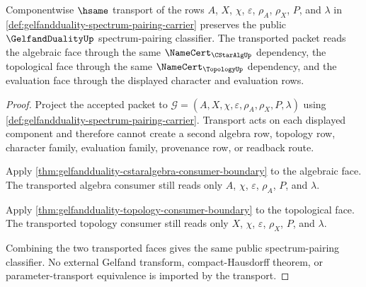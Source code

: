 \begin{theorem}
\label{thm:gelfandduality-spectrum-pairing-classifier-stability}
Componentwise $\hsame$ transport of the rows $A$, $X$, $\chi$, $\varepsilon$,
$\rho_{A}$, $\rho_{X}$, $P$, and $\lambda$ in
\autoref{def:gelfandduality-spectrum-pairing-carrier} preserves the public
$\GelfandDualityUp$ spectrum-pairing classifier. The transported packet reads
the algebraic face through the same $\NameCert_{\CStarAlgUp}$ dependency, the
topological face through the same $\NameCert_{\TopologyUp}$ dependency, and the
evaluation face through the displayed character and evaluation rows.
\end{theorem}
\begin{proof}
Project the accepted packet to
$\mathcal{G}=(A,X,\chi,\varepsilon,\rho_{A},\rho_{X},P,\lambda)$ using
\autoref{def:gelfandduality-spectrum-pairing-carrier}. Transport acts on each
displayed component and therefore cannot create a second algebra row, topology
row, character family, evaluation family, provenance row, or readback route.

Apply \autoref{thm:gelfandduality-cstaralgebra-consumer-boundary} to the
algebraic face. The transported algebra consumer still reads only $A$, $\chi$,
$\varepsilon$, $\rho_{A}$, $P$, and $\lambda$.

Apply \autoref{thm:gelfandduality-topology-consumer-boundary} to the
topological face. The transported topology consumer still reads only $X$,
$\chi$, $\varepsilon$, $\rho_{X}$, $P$, and $\lambda$.

Combining the two transported faces gives the same public spectrum-pairing
classifier. No external Gelfand transform, compact-Hausdorff theorem, or
parameter-transport equivalence is imported by the transport.
\end{proof}

